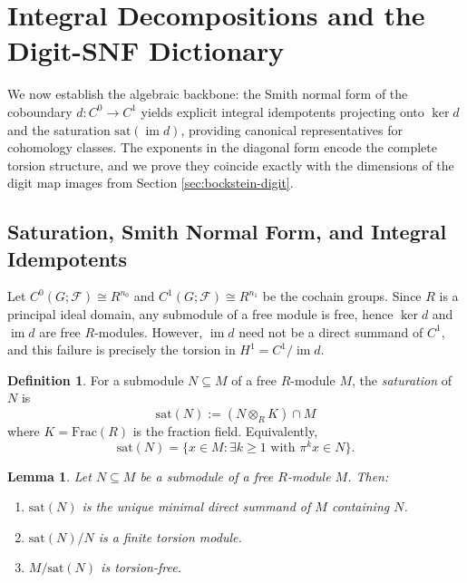 \documentclass[11pt]{amsart}
\theoremstyle{plain}
\newtheorem{lemma}[theorem]{Lemma}
\theoremstyle{definition}
\newtheorem{definition}[theorem]{Definition}
\newcommand{\Ring}{R}                          %
\newcommand{\unif}{\pi}                        %
\newcommand{\sheaf}[1]{\mathcal{#1}}                  %
\newcommand{\sat}{\mathrm{sat}}
\newcommand{\coboundary}{d}                           %
\DeclareMathOperator{\im}{im}                         %
\begin{document}
\section{Integral Decompositions and the Digit-SNF Dictionary}
\label{sec:snf}

We now establish the algebraic backbone: the Smith normal form of the coboundary 
$\coboundary: C^0 \to C^1$ yields explicit integral idempotents projecting onto 
$\ker \coboundary$ and the saturation $\sat(\im \coboundary)$, providing canonical 
representatives for cohomology classes. The exponents in the diagonal form encode 
the complete torsion structure, and we prove they coincide exactly with the 
dimensions of the digit map images from Section \ref{sec:bockstein-digit}.

\subsection{Saturation, Smith Normal Form, and Integral Idempotents}
\label{ssec:snf-construction}

Let $C^0(G;\sheaf{F}) \cong \Ring^{n_0}$ and $C^1(G;\sheaf{F}) \cong \Ring^{n_1}$ 
be the cochain groups. Since $\Ring$ is a principal ideal domain, any submodule 
of a free module is free, hence $\ker \coboundary$ and $\im \coboundary$ are free 
$\Ring$-modules. However, $\im \coboundary$ need not be a direct summand of $C^1$, 
and this failure is precisely the torsion in $H^1 = C^1/\im \coboundary$.

\begin{definition}
\label{def:saturation}
For a submodule $N \subseteq M$ of a free $\Ring$-module $M$, the \emph{saturation} 
of $N$ is
\[
\sat(N) := (N \otimes_{\Ring} K) \cap M
\]
where $K = \mathrm{Frac}(\Ring)$ is the fraction field. Equivalently,
\[
\sat(N) = \{x \in M : \exists k \geq 1 \text{ with } \unif^k x \in N\}.
\]
\end{definition}

\begin{lemma}
\label{lem:saturation-properties}
Let $N \subseteq M$ be a submodule of a free $\Ring$-module $M$. Then:
\begin{enumerate}[label=\textup{(\roman*)}]
\item $\sat(N)$ is the unique minimal direct summand of $M$ containing $N$.
\item $\sat(N)/N$ is a finite torsion module.
\item $M/\sat(N)$ is torsion-free.
\end{enumerate}
\end{lemma}
\end{document}

